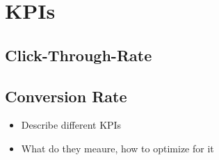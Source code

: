 \section{KPIs}
\subsection{Click-Through-Rate}
\subsection{Conversion Rate}\label{conversion_rate}
\begin{itemize}
\item Describe different KPIs
\item What do they meaure, how to optimize for it
\end{itemize}